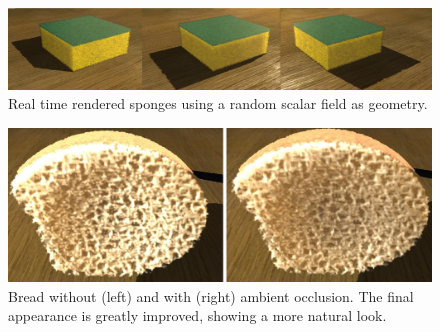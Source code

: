 \begin{figure}
  \centerline{\includegraphics[width=13cm]{figures/sponges}}
  \caption{Real time rendered sponges using a random scalar field as geometry.}
  \label{fg:sponges}
\end{figure}


\begin{figure}
\centerline{\includegraphics[width=13cm]{figures/occlusion}}
  \caption{Bread without (left) and with (right) ambient occlusion. The final appearance is greatly improved, showing a more natural look. }
  \label{fg:occlusion}
\end{figure}
